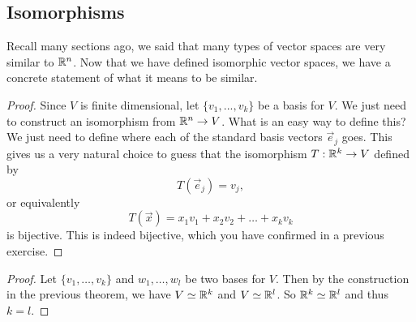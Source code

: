 \subsection{Isomorphisms}
Recall many sections ago, we said that many types of vector spaces are very similar to $\mathbb{R}^n$. Now that we have defined isomorphic vector spaces, we have a concrete statement of what it means to be similar.
\begin{proof}
	Since $V$ is finite dimensional, let $\{v_1,...,v_k\}$ be a basis for $V$.
	We just need to construct an isomorphism from $\mathbb{R}^n \to V$. What is an easy way to define this? We just need to define where each of the standard basis vectors $\vec{e}_j$ goes. This gives us a very natural choice to guess that the isomorphism $T:\mathbb{R}^k\to V$ defined by \[
		T(\vec{e}_j)=v_j,	
	\]
	or equivalently \[
	T(\vec{x})=x_1v_1+x_2v_2+\ldots+x_kv_k
	\]
	is bijective. This is indeed bijective, which you have confirmed in a previous exercise.	
\end{proof}
\begin{proof}
	Let $\{v_1,\ldots,v_k\}$ and ${w_1,\ldots, w_l}$ be two bases for $V$. Then by the construction in the previous theorem, we have $V\simeq \mathbb{R}^k$ and $V\simeq \mathbb{R}^l$. So $\mathbb{R}^k\simeq \mathbb{R}^l$ and thus $k=l$.
\end{proof}
